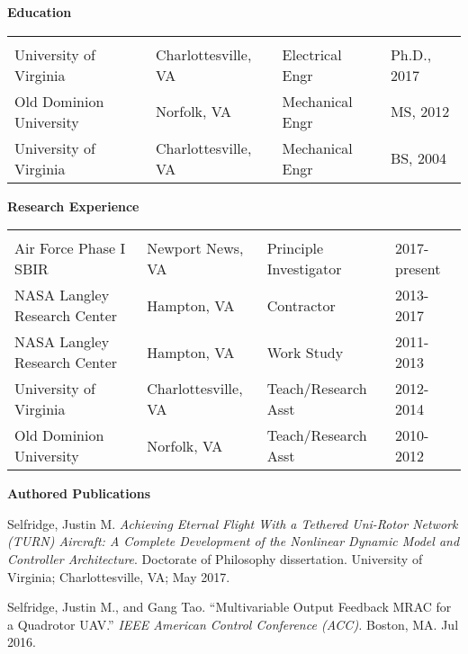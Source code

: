 \documentclass[11pt]{article}
\newcommand{\PubSpace}{\vspace{-0.12cm}}  %
\begin{document}
{\bf Education} \\
\begin{tabular}{llll}
\vspace{-0.15in}
\hspace{2.2in} &
\hspace{1.3in} &
\hspace{1.3in} &
\hspace{0.0in} \\
University of Virginia &
Charlottesville, VA &
Electrical Engr &
Ph.D., 2017 \\
Old Dominion University &
Norfolk, VA &
Mechanical Engr &
MS, 2012 \\
University of Virginia &
Charlottesville, VA &
Mechanical Engr &
BS, 2004
\end{tabular}


{\bf Research Experience} \\
\begin{tabular}{llll}
\vspace{-0.15in}
\hspace{2.2in} &
\hspace{1.3in} &
\hspace{1.3in} &
\hspace{0.0in} \\
Air Force Phase I SBIR &
Newport News, VA &
Principle Investigator &
2017-present \\
NASA Langley Research Center &
Hampton, VA &
Contractor &
2013-2017 \\
NASA Langley Research Center &
Hampton, VA &
Work Study &
2011-2013 \\
University of Virginia &
Charlottesville, VA &
Teach/Research Asst &
2012-2014 \\
Old Dominion University &
Norfolk, VA &
Teach/Research Asst &
2010-2012
\end{tabular}


{\bf Authored Publications} \\
\vspace{-0.2in}

\PubSpace
Selfridge, Justin M.
\emph{Achieving Eternal Flight With a Tethered Uni-Rotor Network (TURN) Aircraft: A Complete Development of the Nonlinear Dynamic Model and Controller Architecture}.
Doctorate of Philosophy dissertation.
University of Virginia; Charlottesville, VA;
May 2017.

\PubSpace
Selfridge, Justin M., and Gang Tao.
``Multivariable Output Feedback MRAC for a Quadrotor UAV.''
\emph{IEEE American Control Conference (ACC).}
Boston, MA.
Jul 2016.
\end{document}
